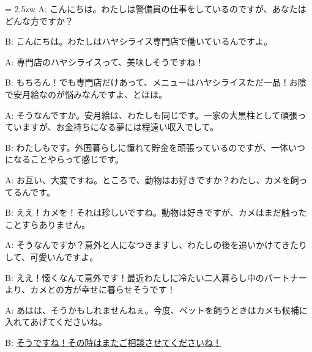 \documentclass[11pt]{amsart}
\title{}
\author{}
\newenvironment{hangall}[1]{\hangindent = 2.5zw\everypar{\hangindent = 2.5zw}}{}
\begin{document}
\maketitle
\begin{hangall}{}%
A: こんにちは。わたしは警備員の仕事をしているのですが、あなたはどんな方ですか？

B: こんにちは。わたしはハヤシライス専門店で働いているんですよ。

A: 専門店のハヤシライスって、美味しそうですね！

B: もちろん！でも専門店だけあって、メニューはハヤシライスただ一品！お陰で安月給なのが悩みなんですよ、とほほ。

A: そうなんですか。安月給は、わたしも同じです。一家の大黒柱として頑張っていますが、お金持ちになる夢には程遠い収入でして。

B: わたしもです。外国暮らしに憧れて貯金を頑張っているのですが、一体いつになることやらって感じです。

A: お互い、大変ですね。ところで、動物はお好きですか？わたし、カメを飼ってるんです。

B: ええ！カメを！それは珍しいですね。動物は好きですが、カメはまだ触ったことすらありません。

A: そうなんですか？意外と人になつきますし、わたしの後を追いかけてきたりして、可愛いんですよ。

B: ええ！懐くなんて意外です！最近わたしに冷たい二人暮らし中のパートナーより、カメとの方が幸せに暮らせそうです！

A: あはは、そうかもしれませんねぇ。今度、ペットを飼うときはカメも候補に入れてあげてくださいね。

B: \ul{そうですね！その時はまたご相談させてくださいね！}\end{hangall}
\end{document}
